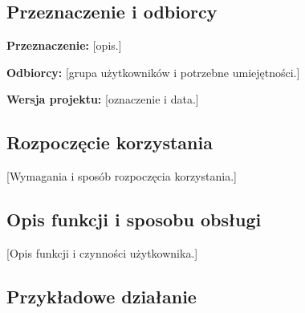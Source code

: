 \documentclass[11pt,a4paper,oneside]{article}
\newif\ifpodpowiedzi
\newcommand{\podpowiedz}[1]{\ifpodpowiedzi\par\begingroup\small\color{hintcolor}\textit{Wskazówka: #1}\par\endgroup\fi}
\newcommand{\pole}[1]{\textnormal{[#1]}}
\begin{document}
\subsection{Przeznaczenie i odbiorcy}
\podpowiedz{Wyjaśnij, do czego służy rozwiązanie, kto może z niego korzystać i jakie zadania umożliwia. Podaj wersję projektu, której dotyczy instrukcja. Używaj języka zrozumiałego dla wskazanego odbiorcy.}
\textbf{Przeznaczenie:} \pole{opis.}\par
\textbf{Odbiorcy:} \pole{grupa użytkowników i potrzebne umiejętności.}\par
\textbf{Wersja projektu:} \pole{oznaczenie i data.}


\subsection{Rozpoczęcie korzystania}
\podpowiedz{Podaj wymagania istotne dla użytkownika i sposób rozpoczęcia pracy: adres aplikacji, uruchamiany plik, odtwarzacz, urządzenie lub punkt wejścia do biblioteki. Wskaż potrzebne konto, uprawnienia i dane wejściowe, jeśli występują. Odwołaj się do dokumentacji instalacyjnej, jeśli jest wymagana; nie opisuj środowiska deweloperskiego.}
\pole{Wymagania i sposób rozpoczęcia korzystania.}

\subsection{Opis funkcji i sposobu obsługi}
\podpowiedz{Opisz dostępne funkcje oraz sposób ich użycia, grupując je według zadań użytkownika. Wyjaśnij istotne elementy interfejsu, polecenia i ustawienia. Dla animacji może to być sposób odtwarzania i korzystania z przekazanych formatów; dla prototypu - sterowanie; dla biblioteki - publiczny interfejs i przykłady wywołań.}
\pole{Opis funkcji i czynności użytkownika.}
\podpowiedz{Dodaj czytelne zrzuty ekranu lub ilustracje tam, gdzie pomagają wykonać zadanie. Każdy rysunek powinien mieć podpis i odwołanie w tekście przez \texttt{\textbackslash ref}. Nie zastępuj instrukcji samymi obrazami.}

\subsection{Przykładowe działanie}
\podpowiedz{Przedstaw konkretne scenariusze najważniejszych zadań. Dla każdego podaj cel, warunki początkowe, przykładowe dane, kolejne kroki i oczekiwany rezultat. Przykład powinien być możliwy do odtworzenia. Powielaj poniższy blok według potrzeb.}
\end{document}
